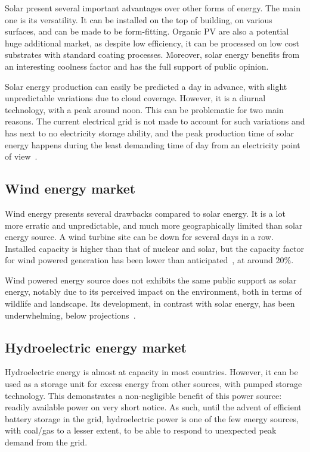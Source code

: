 \documentclass[IJPHM, 2017, 29]{PHMSociety}
\begin{document}
Solar present several important advantages over other forms of energy. The main one is its versatility. It can be installed on the top of building, on various surfaces, and can be made to be form-fitting. Organic PV are also a potential huge additional market, as despite low efficiency, it can be processed on low cost substrates with standard coating processes. Moreover, solar energy benefits from an interesting coolness factor and has the full support of public opinion.

Solar energy production can easily be predicted a day in advance, with slight unpredictable variations due to cloud coverage. However, it is a diurnal technology, with a peak around noon. This can be problematic for two main reasons. The current electrical grid is not made to account for such variations and has next to no electricity storage ability, and the peak production time of solar energy happens during the least demanding time of day from an electricity point of view~\citep{solar_peak}.


\subsection{Wind energy market}

Wind energy presents several drawbacks compared to solar energy. It is a lot more erratic and unpredictable, and much more geographically limited than solar energy source. A wind turbine site can be down for several days in a row. Installed capacity is higher than that of nuclear and solar, but the capacity factor for wind powered generation has been lower than anticipated~\citep{wind_cf}, at around 20\%.

Wind powered energy source does not exhibits the same public support as solar energy, notably due to its perceived impact on the environment, both in terms of wildlife and landscape. Its development, in contrast with solar energy, has been underwhelming, below projections~\citep{wind_perf}.


\subsection{Hydroelectric energy market}

Hydroelectric energy is almost at capacity in most countries. However, it can be used as a storage unit for excess energy from other sources, with pumped storage technology. This demonstrates a non-negligible benefit of this power source: readily available power on very short notice. As such, until the advent of efficient battery storage in the grid, hydroelectric power is one of the few energy sources, with coal/gas to a lesser extent, to be able to respond to unexpected peak demand from the grid. 
\end{document}

